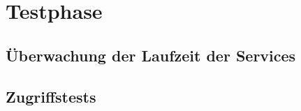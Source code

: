 \section{Testphase}
\label{sec:Testphase}

\subsection{Überwachung der Laufzeit der Services}
\label{Überwachung der Laufzeit der Services}

\subsection{Zugriffstests}
\label{Zugriffstests}